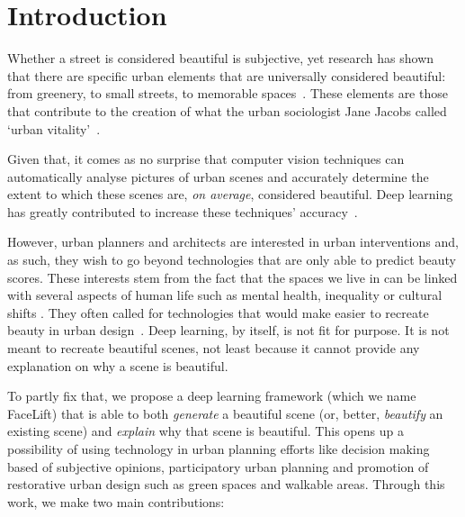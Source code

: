 \section{Introduction}


Whether a street is considered beautiful is subjective, yet research has shown that there are specific urban elements that are universally considered beautiful: from greenery, to small streets, to memorable spaces~\cite{alexander1977pattern, quercia2014aesthetic,salesses2013collaborative}. These elements are those that contribute to the creation of what the urban sociologist Jane Jacobs called `urban vitality'~\cite{jacobs1961death}. 


Given that, it comes as no surprise that computer vision techniques can automatically analyse pictures of urban scenes and accurately determine the extent to which these scenes are, \emph{on average}, considered beautiful.  Deep learning has greatly contributed to increase these techniques' accuracy~\cite{dubey2016deep}.

However, urban planners and architects are interested in urban interventions and, as such, they wish to go beyond technologies that are only able to predict beauty scores. These interests stem from the fact that the spaces we live in can be linked with several aspects of human life such as mental health\cite{seresinhe2015quantifying}, inequality \cite{salesses2013collaborative} or cultural shifts \cite{10.3389/fphy.2018.00027}. They often called for technologies that would make easier to recreate beauty in urban design~\cite{de2008architecture}. Deep learning, by itself, is not fit for purpose. It is not meant to recreate beautiful scenes, not least because it cannot provide any explanation on why a scene is beautiful. 


To partly fix that, we propose a deep learning framework (which we name  FaceLift) that is able to both \emph{generate} a beautiful scene (or, better, \emph{beautify} an existing scene) and \emph{explain} why that scene is beautiful. This opens up a possibility of using technology in urban planning efforts like decision making based of subjective opinions, participatory urban planning and promotion of restorative urban design such as green spaces and walkable areas.  Through this work, we make two main contributions:

